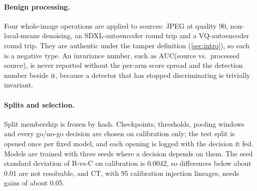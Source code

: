 \paragraph{Benign processing.}
Four whole-image operations are applied to sources: JPEG at quality 90, non-local-means denoising, an SDXL-autoencoder round trip and a VQ-autoencoder round trip. %
They are authentic under the tamper definition (\cref{sec:intro}), so each is a negative type.
An invariance number, such as AUC(source vs.\ processed source), is never reported without the per-arm score spread and the detection number beside it, because a detector that has stopped discriminating is trivially invariant. %

\paragraph{Splits and selection.}
Split membership is frozen by hash.
Checkpoints, thresholds, pooling windows and every go/no-go decision are chosen on calibration only; the test split is opened once per fixed model, and each opening is logged with the decision it fed.
Models are trained with three seeds where a decision depends on them.
The seed standard deviation of B-vs-C on calibration is 0.0042, %
so differences below about 0.01 are not resolvable, and CT, with 95 calibration injection lineages, %
needs gains of about 0.05. %

